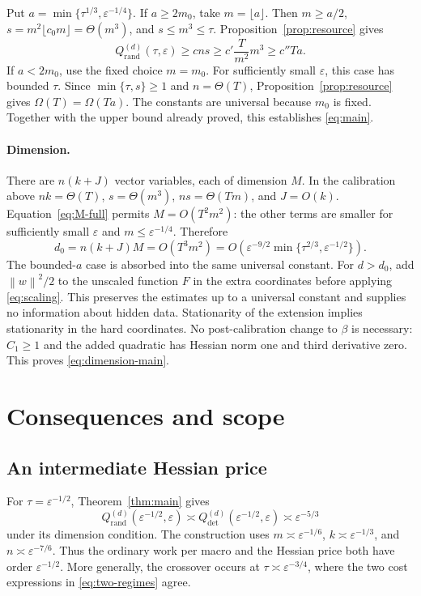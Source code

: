 \documentclass[11pt]{article}
\theoremstyle{definition}
\theoremstyle{remark}
\newcommand{\eps}{\varepsilon}
\newcommand{\norm}[1]{\left\|#1\right\|}
\newcommand{\Qrand}{Q_{\mathrm{rand}}}
\newcommand{\Qdet}{Q_{\mathrm{det}}}
\begin{document}
Put $a=\min\{\tau^{1/3},\eps^{-1/4}\}$. If $a\ge2m_0$, take $m=\lfloor a\rfloor$. Then $m\ge a/2$, $s=m^2\lfloor c_0m\rfloor=\Theta(m^3)$, and $s\le m^3\le\tau$. Proposition~\ref{prop:resource} gives
\[
 \Qrand^{(d)}(\tau,\eps)\ge cns\ge c'\frac{T}{m^2}m^3
 \ge c''Ta.
\]
If $a<2m_0$, use the fixed choice $m=m_0$. For sufficiently small $\eps$, this case has bounded $\tau$. Since $\min\{\tau,s\}\ge1$ and $n=\Theta(T)$, Proposition~\ref{prop:resource} gives $\Omega(T)=\Omega(Ta)$. The constants are universal because $m_0$ is fixed. Together with the upper bound already proved, this establishes \eqref{eq:main}.

\paragraph{Dimension.}
There are $n(k+J)$ vector variables, each of dimension $M$. In the calibration above $nk=\Theta(T)$, $s=\Theta(m^3)$, $ns=\Theta(Tm)$, and $J=O(k)$. Equation~\eqref{eq:M-full} permits $M=O(T^2m^2)$: the other terms are smaller for sufficiently small $\eps$ and $m\le\eps^{-1/4}$. Therefore
\[
 d_0=n(k+J)M=O(T^3m^2)
 =O\!\left(\eps^{-9/2}\min\{\tau^{2/3},\eps^{-1/2}\}\right).
\]
The bounded-$a$ case is absorbed into the same universal constant. For $d>d_0$, add $\norm w^2/2$ to the unscaled function $F$ in the extra coordinates before applying \eqref{eq:scaling}. This preserves the estimates up to a universal constant and supplies no information about hidden data. Stationarity of the extension implies stationarity in the hard coordinates. No post-calibration change to $\beta$ is necessary: $C_1\ge1$ and the added quadratic has Hessian norm one and third derivative zero. This proves \eqref{eq:dimension-main}.

\section{Consequences and scope}\label{sec:consequences}
\subsection{An intermediate Hessian price}
For $\tau=\eps^{-1/2}$, Theorem~\ref{thm:main} gives
\[
 \Qrand^{(d)}(\eps^{-1/2},\eps)
 \asymp
 \Qdet^{(d)}(\eps^{-1/2},\eps)
 \asymp \eps^{-5/3}
\]
under its dimension condition. The construction uses
$m\asymp\eps^{-1/6}$, $k\asymp\eps^{-1/3}$, and
$n\asymp\eps^{-7/6}$. Thus the ordinary work per macro and the
Hessian price both have order $\eps^{-1/2}$.
More generally, the crossover occurs at $\tau\asymp\eps^{-3/4}$,
where the two cost expressions in \eqref{eq:two-regimes} agree.
\end{document}
